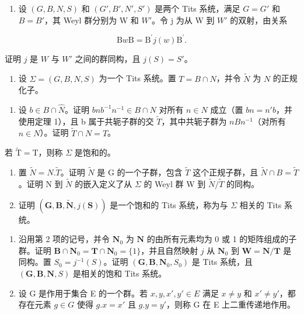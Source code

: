 \begin{enumerate}
\def\labelenumi{\arabic{enumi})}
\setcounter{enumi}{3}
\tightlist
\item
  设 \((G, B, N, S)\) 和 \((G', B', N', S')\) 是两个 Tits 系统，满足 \(G = G'\) 和 \(B = B'\)，其 Weyl 群分别为 W 和 \(W'\)。令 j 为从 W 到 \(W'\) 的双射，由关系
\end{enumerate}

\[
\mathrm{B} w \mathrm{B} = \mathrm{B} ^ {\prime} j (w) \mathrm{B} ^ {\prime}.
\]

证明 \(j\) 是 \(W\) 与 \(W'\) 之间的群同构，且 \(j(S) = S'\)。

\begin{enumerate}
\def\labelenumi{\arabic{enumi})}
\setcounter{enumi}{4}
\tightlist
\item
  设 \(\Sigma = (G, B, N, S)\) 为一个 Tits 系统。置 \(T = B \cap N\)，并令 \(\tilde{N}\) 为 \(N\) 的正规化子。
\end{enumerate}

\begin{enumerate}
\def\labelenumi{\alph{enumi})}
\tightlist
\item
  设 \(b \in B \cap \hat{N}\)。证明 \(bnb^{-1}n^{-1} \in B \cap N\) 对所有 \(n \in N\) 成立（置 \(bn = n'b\)，并使用定理 1），且 b 属于共轭子群的交 \(\tilde{T}\)，其中共轭子群为 \(nBn^{-1}\)（对所有 \(n \in N\)）。证明 \(\tilde{T} \cap N = T\)。
\end{enumerate}

若 \(\tilde{\mathrm{T}} = \mathrm{T}\)，则称 \(\Sigma\) 是饱和的。

\begin{enumerate}
\def\labelenumi{\alph{enumi})}
\setcounter{enumi}{1}
\item
  置 \(\tilde{N} = N.\tilde{T}\)。证明 \(\tilde{N}\) 是 G 的一个子群，包含 \(\tilde{T}\) 这个正规子群，且 \(\tilde{N} \cap B = \tilde{T}\)。证明 N 到 \(\tilde{N}\) 的嵌入定义了从 \(\Sigma\) 的 Weyl 群 W 到 \(\tilde{N}/\tilde{T}\) 的同构。
\item
  证明 \((\mathbf{G},\mathbf{B},\tilde{\mathbf{N}},j(\mathbf{S}))\) 是一个饱和的 Tits 系统，称为与 \(\Sigma\) 相关的 Tits 系统。
\end{enumerate}

\begin{enumerate}
\def\labelenumi{\arabic{enumi})}
\setcounter{enumi}{5}
\item
  沿用第 2 项的记号，并令 \(\mathbf{N}_0\) 为 \(\mathbf{N}\) 的由所有元素均为 0 或 1 的矩阵组成的子群。证明 \(\mathbf{B} \cap \mathbf{N}_0 = \mathbf{T} \cap \mathbf{N}_0 = \{1\}\)，并且自然映射 \(j\) 从 \(\mathbf{N}_0\) 到 \(\mathbf{W} = \mathbf{N} / \mathbf{T}\) 是同构。置 \(S_0 = j^{-1}(S)\)。证明 \((\mathbf{G}, \mathbf{B}, \mathbf{N}_0, S_0)\) 是 Tits 系统，且 \((\mathbf{G}, \mathbf{B}, \mathbf{N}, S)\) 是相关的饱和 Tits 系统。
\item
  设 G 是作用于集合 E 的一个群。若 \(x, y, x', y' \in E\) 满足 \(x \neq y\) 和 \(x' \neq y'\)，都存在元素 \(g \in G\) 使得 \(g.x = x'\) 且 \(g.y = y'\)，则称 G 在 E 上二重传递地作用。
\end{enumerate}

